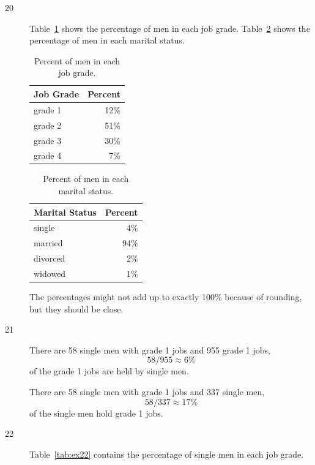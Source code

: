 \documentclass[letterpaper, landscape]{exam}
\begin{document}
\begin{description}
      \item[20] 
        Table~\ref{tab:ex20a} shows the percentage of men in each job grade.
        Table~\ref{tab:ex20b} shows the percentage of men in each marital status.
        
        \begin{table}[H]
          \centering
          \begin{tabular}{lr}
            \toprule
            Job Grade & Percent \\
            \midrule
            grade 1   & 12\% \\
            grade 2   & 51\% \\
            grade 3   & 30\% \\
            grade 4   & 7\% \\
            \bottomrule
          \end{tabular}
          \caption{Percent of men in each job grade.}\label{tab:ex20a}
        \end{table}

        \begin{table}[H]
          \centering
          \begin{tabular}{lr}
            \toprule
            Marital Status & Percent \\
            \midrule
            single         & 4\% \\
            married        & 94\% \\
            divorced       & 2\% \\
            widowed        & 1\% \\
            \bottomrule
          \end{tabular}
          \caption{Percent of men in each marital status.}\label{tab:ex20b}
        \end{table}
      The percentages might not add up to exactly 100\% because of rounding, but
      they should be close.
      
    \newpage

    \item[21]
      There are 58 single men with grade 1 jobs and 955 grade 1 jobs, 
      \[
        58/955 \approx 6 \%
      \]
      of the grade 1 jobs are held by single men.

      There are 58 single men with grade 1 jobs and 337 single men, 
      \[
        58/337 \approx 17 \% 
      \]
      of the single men hold grade 1 jobs.

    \item[22]
      Table~\ref{tab:ex22} contains the percentage of single men in each job
      grade.


\end{description}
\end{document}
